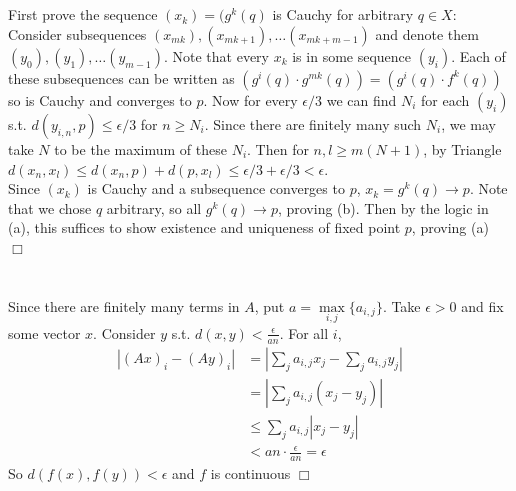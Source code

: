 \documentclass{article}
\begin{document}
\subsection{}
First prove the sequence $(x_k) = (g^k (q)$ is Cauchy for arbitrary $q \in X$:\\
Consider subsequences $(x_{mk}),(x_{mk+1}),\dots (x_{mk+m-1})$ and denote them\\
$(y_0),(y_1), \dots (y_{m-1})$. Note that every $x_k$ is in some sequence $(y_i)$. Each of these subsequences can be written as $(g^i (q) \cdot g^{mk}(q)) = (g^i (q) \cdot f^{k}(q))$ so is Cauchy and converges to $p$. Now for every $\epsilon / 3$ we can find $N_i$ for each $(y_i)$ s.t. $d(y_{i,n},p) \leq \epsilon /3$ for $n\geq N_i$. Since there are finitely many such $N_i$, we may take $N$ to be the maximum of these $N_i$. Then for $n,l \geq m(N+1)$, by Triangle $d(x_n,x_l) \leq d(x_n,p) + d(p,x_l) \leq \epsilon/3 + \epsilon/3 < \epsilon$.\\
Since $(x_k)$ is Cauchy and a subsequence converges to $p$, $x_k = g^k (q)\rightarrow p$. Note that we chose $q$ arbitrary, so all $g^k (q) \rightarrow p$, proving (b). Then by the logic in (a), this suffices to show existence and uniqueness of fixed point $p$, proving (a) $\Box$

\section{}
\subsection{}
Since there are finitely many terms in $A$, put $a = \max\limits_{i,j} \{a_{i,j}\}$. Take $\epsilon > 0$ and fix some vector $x$. Consider $y$ s.t. $d(x,y) < \frac{\epsilon}{an}$. For all $i$,
\begin{equation*}
    \begin{split}
        |(Ax)_i - (Ay)_i| &= |\sum\limits_{j}a_{i,j}x_j - \sum\limits_{j}a_{i,j}y_j|\\
        &= |\sum\limits_{j}a_{i,j}(x_j-y_j)|\\
        &\leq \sum\limits_{j} a_{i,j} |x_j - y_j|\\
        &< an\cdot \frac{\epsilon}{an} = \epsilon
    \end{split}
\end{equation*}
So $d(f(x),f(y))<\epsilon$ and $f$ is continuous $\Box$
\end{document}
